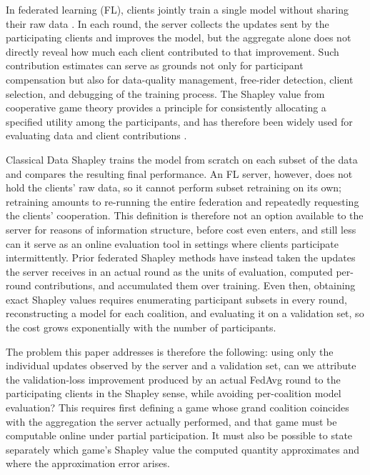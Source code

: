 \documentclass[letterpaper]{article} %
\theoremstyle{definition} %
\begin{document}
In federated learning (FL), clients jointly train a single model without
sharing their raw data \citep{mcmahan2016federated,kairouz2021advances}. In each round, the
server collects the updates sent by the participating clients and improves
the model, but the aggregate alone does not directly reveal how much each
client contributed to that improvement. Such contribution estimates can serve
as grounds not only for participant compensation but also for data-quality
management, free-rider detection, client selection, and debugging of the
training process. The Shapley value from cooperative game theory provides a
principle for consistently allocating a specified utility among the
participants, and has therefore been widely used for evaluating data and
client contributions \citep{shapley1953value,ghorbani2019data}.

Classical Data Shapley trains the model from scratch on each subset of the
data and compares the resulting final performance. An FL server, however,
does not hold the clients' raw data, so it cannot perform subset retraining
on its own; retraining amounts to re-running the entire federation and
repeatedly requesting the clients' cooperation. This definition is therefore
not an option available to the server for reasons of information structure,
before cost even enters, and still less can it serve as an online evaluation
tool in settings where clients participate intermittently. Prior federated
Shapley methods have instead taken the updates the server receives in an
actual round as the units of evaluation, computed per-round contributions,
and accumulated them over training. Even then, obtaining exact Shapley values
requires enumerating participant subsets in every round, reconstructing a
model for each coalition, and evaluating it on a validation set, so the cost
grows exponentially with the number of participants.

The problem this paper addresses is therefore the following: using only the
individual updates observed by the server and a validation set, can we
attribute the validation-loss improvement produced by an actual FedAvg round
to the participating clients in the Shapley sense, while avoiding
per-coalition model evaluation? This requires first defining a game whose
grand coalition coincides with the aggregation the server actually performed,
and that game must be computable online under partial participation. It must
also be possible to state separately which game's Shapley value the computed
quantity approximates and where the approximation error arises.
\end{document}
